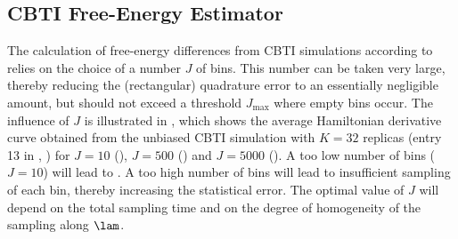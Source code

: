 \subsection{CBTI Free-Energy Estimator} 





The calculation of free-energy differences from CBTI simulations according to
 relies on the choice of a number $J$ of bins. This number can be taken very large, thereby
reducing the (rectangular) quadrature error to an essentially negligible amount,
but should not exceed a threshold $J_{\mathrm{max}}$ where empty bins occur. 
The influence of $J$ is illustrated in , which shows the average 
Hamiltonian derivative curve obtained from the
unbiased CBTI simulation with $K=32$ replicas (entry 13 in , )
for $J=10$ (), $J=500$ () and $J=5000$ ().
%
A too low number of bins (\eg{} $J=10$) will lead to . 
%
A too high number of bins will lead to insufficient sampling of each bin, thereby
increasing the statistical error. The optimal value of $J$ will depend on the
total sampling time and on the degree of homogeneity of the sampling
along $\lam$.

